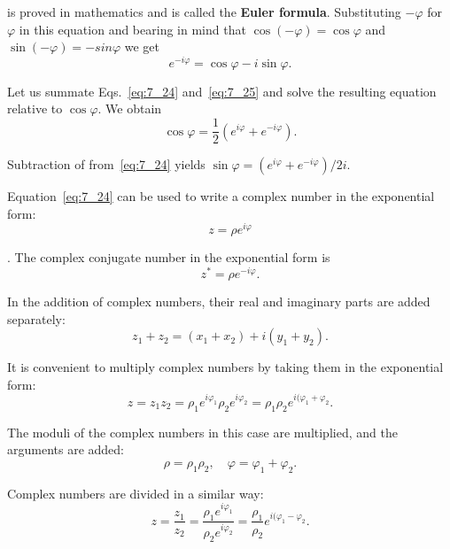 \noindent
is proved in mathematics and is called the \textbf{Euler formula}. Substituting $-\varphi$ for $\varphi$ in this equation and bearing in mind that $\cos(-\varphi)=\cos\varphi$ and $\sin(-\varphi)=-sin\varphi$ we get
\begin{equation}\label{eq:7_25}
	e^{-i\varphi} = \cos\varphi - i\sin\varphi.
\end{equation}

Let us summate Eqs.~\eqref{eq:7_24} and~\eqref{eq:7_25} and solve the resulting equation relative to $\cos\varphi$. We obtain
\begin{equation}\label{eq:7_26}
	\cos\varphi = \frac{1}{2}\left(e^{i\varphi} + e^{-i\varphi}\right).
\end{equation}

\noindent
Subtraction of  from~\eqref{eq:7_24} yields $\sin\varphi=\left(e^{i\varphi} + e^{-i\varphi}\right)/2i$.

Equation~\eqref{eq:7_24} can be used to write a complex number in the exponential form:
\vspace{-12pt}
\begin{equation}\label{eq:7_27}
	z = \rho e^{i\varphi}
\end{equation}

. The complex conjugate number in the exponential form is
\begin{equation}\label{eq:7_28}
	z^* = \rho e^{-i\varphi}.
\end{equation}

\noindent
In the addition of complex numbers, their real and imaginary parts are added separately:
\begin{equation}\label{eq:7_29}
	z_1 + z_2 = (x_1 + x_2) + i(y_1 + y_2).
\end{equation}

It is convenient to multiply complex numbers by taking them in the exponential form:
\begin{equation}\label{eq:7_30}
	z = z_1 z_2 = \rho_1 e^{i\varphi_1} \rho_2 e^{i\varphi_2} = \rho_1\rho_2 e^{i(\varphi_1 + \varphi_2}.
\end{equation}

\noindent
The moduli of the complex numbers in this case are multiplied, and the arguments are added:
\begin{equation}\label{eq:7_31}
	\rho = \rho_1\rho_2,\quad \varphi = \varphi_1 + \varphi_2.
\end{equation}

\noindent
Complex numbers are divided in a similar way:
\begin{equation}\label{eq:7_32}
	z = \frac{z_1}{z_2} = \frac{\rho_1 e^{i\varphi_1}}{\rho_2 e^{i\varphi_2}} = \frac{\rho_1}{\rho_2}e^{i(\varphi_1 - \varphi_2}.
\end{equation}

